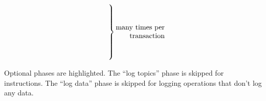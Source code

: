 \begin{table}[h]
\[		\quad
		\setlength{\arraycolsep}{0pt} %
		\begin{array}{ c }
			\vphantom{a_N} \\ %
			\vphantom{a_N} \\ %
			\left.\kern-\nulldelimiterspace
			\vphantom{\begin{array}{ c }
				\text{Hello}  \\ %
				\vdots \\ %
				\vdots \\ %
				\vdots \\ %
				\text{Hello}  \\ %
			\end{array}} \right\}
			\begin{array}{r}
				\text{many times per} \\
				\text{transaction} \\
			\end{array}
		\end{array}
	\]
	\caption{
	Optional phases are \colorbox{solarized-green}{highlighted}. The ``log topics'' phase is skipped for  instructions. The ``log data'' phase is skipped for logging operations that don't log any data.}
	\label{fig: phase 5 subphase table}
\end{table}
